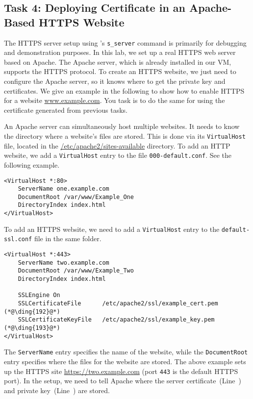 \subsection{Task 4: Deploying Certificate in an Apache-Based HTTPS Website}


The HTTPS server setup using \openssl's \texttt{s\_server} command is primarily for debugging and
demonstration purposes. In this lab, we set up a real HTTPS web server based
on Apache. The Apache server, which is already installed in our VM, supports 
the HTTPS protocol. To create an HTTPS website, we just need to 
configure the Apache server, so it knows where to get the private key and certificates. 
We give an example in the following to show how to enable HTTPS for a website \url{www.example.com}.
You task is to do the same for \pkiserver using the certificate
generated from previous tasks. 

An Apache server can simultaneously host multiple websites. It needs to know
the directory where a website's files are stored. This is done via its 
\texttt{VirtualHost} file, located in the \url{/etc/apache2/sites-available}
directory. To add an HTTP website, we add a \texttt{VirtualHost} entry
to the file \texttt{000-default.conf}. See the following example. 

\begin{lstlisting}
<VirtualHost *:80>
    ServerName one.example.com
    DocumentRoot /var/www/Example_One
    DirectoryIndex index.html
</VirtualHost>
\end{lstlisting}

To add an HTTPS website, we need to add a \texttt{VirtualHost}
entry to the \texttt{default-ssl.conf} file in the same folder. 

\begin{lstlisting}
<VirtualHost *:443>
    ServerName two.example.com
    DocumentRoot /var/www/Example_Two
    DirectoryIndex index.html

    SSLEngine On
    SSLCertificateFile      /etc/apache2/ssl/example_cert.pem  (*@\ding{192}@*)
    SSLCertificateKeyFile   /etc/apache2/ssl/example_key.pem   (*@\ding{193}@*)
</VirtualHost>
\end{lstlisting}

The \texttt{ServerName} entry specifies the name of the website, while
the \texttt{DocumentRoot} entry specifies where the files for 
the website are stored. 
The above example sets up the HTTPS site \url{https://two.example.com} (port \texttt{443} 
is the default HTTPS port).  In the setup, we need to tell Apache where
the server certificate~(Line~) and private key~(Line~) are stored. 


